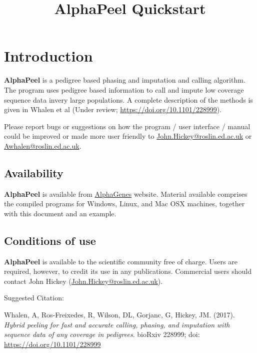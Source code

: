 \documentclass[a4paper]{article}
\begin{document}
\title{AlphaPeel Quickstart%
  \label{alphapeel-quickstart}}
\author{}
\date{}
\maketitle

\label{contents}
\setcounter{tocdepth}{3}

\tableofcontents


\section{Introduction%
  \label{introduction}%
}

\textbf{AlphaPeel} is a pedigree based phasing and imputation and calling algorithm.  The program uses pedigree based information to call and impute low coverage sequence data invery large populations. A complete description of the methods is given in Whalen et al (Under review; \url{https://doi.org/10.1101/228999}).

Please report bugs or suggestions on how the program / user interface / manual could be improved or made more user friendly to \href{mailto:John.Hickey@roslin.ed.ac.uk}{John.Hickey@roslin.ed.ac.uk} or \href{mailto:awhalen@roslin.ed.ac.uk}{Awhalen@roslin.ed.ac.uk}.


\subsection{Availability%
  \label{availability}%
}

\textbf{AlphaPeel} is available from \href{http://www.alphagenes.roslin.ed.ac.uk/software-packages/alphapeel/}{AlphaGenes} website. Material available comprises the compiled programs for Windows, Linux, and Mac OSX machines, together with this document and an example.


\subsection{Conditions of use%
  \label{conditions-of-use}%
}

\textbf{AlphaPeel} is available to the scientific community free of charge. Users are required, however, to credit its use in any publications. Commercial users should contact John Hickey (\href{mailto:John.Hickey@roslin.ed.ac.uk}{John.Hickey@roslin.ed.ac.uk}).

Suggested Citation:

Whalen, A, Ros-Freixedes, R, Wilson, DL, Gorjanc, G, Hickey, JM. (2017). \emph{Hybrid peeling for fast and accurate calling, phasing, and imputation with sequence data of any coverage in pedigrees}. bioRxiv 228999; doi: \url{https://doi.org/10.1101/228999}
\end{document}
